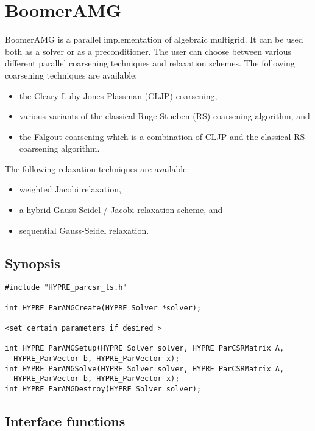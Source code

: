 \section{BoomerAMG}

BoomerAMG is a parallel implementation of algebraic multigrid.
It can be used both as a solver or as a preconditioner.
The user can choose between various different parallel coarsening techniques
and relaxation schemes.
The following coarsening techniques are available:
\begin{itemize}
\item the Cleary-Luby-Jones-Plassman (CLJP) coarsening,
\item various variants of the classical Ruge-Stueben (RS) coarsening algorithm, and
\item the Falgout coarsening which is a combination of CLJP and the
classical RS coarsening algorithm.
\end{itemize}
The following relaxation techniques are available:
\begin{itemize}
\item weighted Jacobi relaxation,
\item a hybrid Gauss-Seidel / Jacobi relaxation scheme, and
\item sequential Gauss-Seidel relaxation.
\end{itemize}



\subsection{Synopsis}

\begin{display}
\begin{verbatim}
#include "HYPRE_parcsr_ls.h"

int HYPRE_ParAMGCreate(HYPRE_Solver *solver); 

<set certain parameters if desired >

int HYPRE_ParAMGSetup(HYPRE_Solver solver, HYPRE_ParCSRMatrix A,
  HYPRE_ParVector b, HYPRE_ParVector x);
int HYPRE_ParAMGSolve(HYPRE_Solver solver, HYPRE_ParCSRMatrix A,
  HYPRE_ParVector b, HYPRE_ParVector x);
int HYPRE_ParAMGDestroy(HYPRE_Solver solver);
\end{verbatim}
\end{display}

\subsection{Interface functions}

